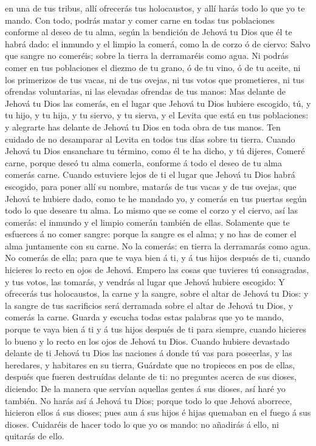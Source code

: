 en una de tus tribus, allí ofrecerás tus holocaustos, y allí harás todo
lo que yo te mando.  Con todo, podrás matar y comer carne
en todas tus poblaciones conforme al deseo de tu alma, según la
bendición de Jehová tu Dios que él te habrá dado: el inmundo y el limpio
la comerá, como la de corzo ó de ciervo:  Salvo que
sangre no comeréis; sobre la tierra la derramaréis como agua.
 Ni podrás comer en tus poblaciones el diezmo de tu
grano, ó de tu vino, ó de tu aceite, ni los primerizos de tus vacas, ni
de tus ovejas, ni tus votos que prometieres, ni tus ofrendas
voluntarias, ni las elevadas ofrendas de tus manos:  Mas
delante de Jehová tu Dios las comerás, en el lugar que Jehová tu Dios
hubiere escogido, tú, y tu hijo, y tu hija, y tu siervo, y tu sierva, y
el Levita que está en tus poblaciones: y alegrarte has delante de Jehová
tu Dios en toda obra de tus manos.  Ten cuidado de no
desamparar al Levita en todos tus días sobre tu tierra. 
Cuando Jehová tu Dios ensanchare tu término, como él te ha dicho, y tú
dijeres, Comeré carne, porque deseó tu alma comerla, conforme á todo el
deseo de tu alma comerás carne.  Cuando estuviere lejos
de ti el lugar que Jehová tu Dios habrá escogido, para poner allí su
nombre, matarás de tus vacas y de tus ovejas, que Jehová te hubiere
dado, como te he mandado yo, y comerás en tus puertas según todo lo que
deseare tu alma.  Lo mismo que se come el corzo y el
ciervo, así las comerás: el inmundo y el limpio comerán también de
ellas.  Solamente que te esfuerces á no comer sangre:
porque la sangre es el alma; y no has de comer el alma juntamente con su
carne.  No la comerás: en tierra la derramarás como agua.
 No comerás de ella; para que te vaya bien á ti, y á tus
hijos después de ti, cuando hicieres lo recto en ojos de Jehová.
 Empero las cosas que tuvieres tú consagradas, y tus
votos, las tomarás, y vendrás al lugar que Jehová hubiere escogido:
 Y ofrecerás tus holocaustos, la carne y la sangre, sobre
el altar de Jehová tu Dios: y la sangre de tus sacrificios será
derramada sobre el altar de Jehová tu Dios, y comerás la carne.
 Guarda y escucha todas estas palabras que yo te mando,
porque te vaya bien á ti y á tus hijos después de ti para siempre,
cuando hicieres lo bueno y lo recto en los ojos de Jehová tu Dios.
 Cuando hubiere devastado delante de ti Jehová tu Dios
las naciones á donde tú vas para poseerlas, y las heredares, y habitares
en su tierra,  Guárdate que no tropieces en pos de ellas,
después que fueren destruídas delante de ti: no preguntes acerca de sus
dioses, diciendo: De la manera que servían aquellas gentes á sus dioses,
así haré yo también.  No harás así á Jehová tu Dios;
porque todo lo que Jehová aborrece, hicieron ellos á sus dioses; pues
aun á sus hijos é hijas quemaban en el fuego á sus dioses.
 Cuidaréis de hacer todo lo que yo os mando: no añadirás
á ello, ni quitarás de ello.

